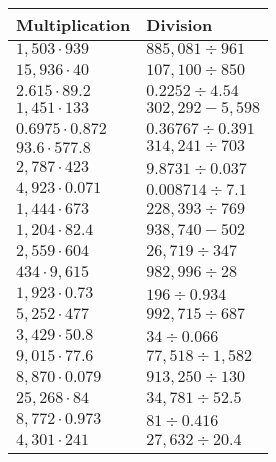 \begin{longtable}[]{@{}ll@{}}
\toprule
Multiplication & Division\tabularnewline
\midrule
\endhead
\(1,503\cdot939\) & \(885,081÷961\)\tabularnewline
\(15,936\cdot40\) & \(107,100÷850\)\tabularnewline
\(2.615\cdot89.2\) & \(0.2252÷4.54\)\tabularnewline
\(1,451\cdot133\) & \(302,292 - 5,598\)\tabularnewline
\(0.6975\cdot0.872\) & \(0.36767÷0.391\)\tabularnewline
\(93.6\cdot577.8\) & \(314,241÷703\)\tabularnewline
\(2,787\cdot423\) & \(9.8731÷0.037\)\tabularnewline
\(4,923\cdot0.071\) & \(0.008714÷7.1\)\tabularnewline
\(1,444\cdot673\) & \(228,393÷769\)\tabularnewline
\(1,204\cdot82.4\) & \(938,740 - 502\)\tabularnewline
\(2,559\cdot604\) & \(26,719÷347\)\tabularnewline
\(434\cdot9,615\) & \(982,996÷28\)\tabularnewline
\(1,923\cdot0.73\) & \(196÷0.934\)\tabularnewline
\(5,252\cdot477\) & \(992,715÷687\)\tabularnewline
\(3,429\cdot50.8\) & \(34÷0.066\)\tabularnewline
\(9,015\cdot77.6\) & \(77,518÷1,582\)\tabularnewline
\(8,870\cdot0.079\) & \(913,250÷130\)\tabularnewline
\(25,268\cdot84\) & \(34,781÷52.5\)\tabularnewline
\(8,772\cdot0.973\) & \(81÷0.416\)\tabularnewline
\(4,301\cdot241\) & \(27,632÷20.4\)\tabularnewline
\bottomrule
\end{longtable}
